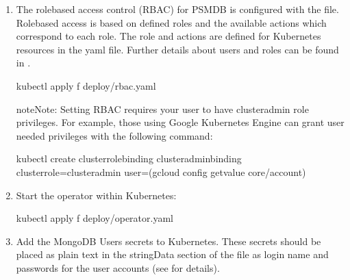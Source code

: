 \documentclass[letterpaper,10pt,english]{sphinxmanual}
\begin{document}
\begin{enumerate}
\begin{sphinxVerbatim}[commandchars=\\\{\}]
\PYGZdl{} kubectl create namespace psmdb
\PYGZdl{} kubectl config set\PYGZhy{}context kubectl config current\PYGZhy{}context \PYGZhy{}\PYGZhy{}namespacepsmdb
\end{sphinxVerbatim}

\item {} 
The role\sphinxhyphen{}based access control (RBAC) for PSMDB is configured with the  file. Role\sphinxhyphen{}based access is
based on defined roles and the available actions which correspond to
each role. The role and actions are defined for Kubernetes resources in the yaml file. Further details
about users and roles can be found in .

\begin{sphinxVerbatim}[commandchars=\\\{\}]
\PYGZdl{} kubectl apply \PYGZhy{}f deploy/rbac.yaml
\end{sphinxVerbatim}

\begin{sphinxadmonition}{note}{Note:}
Setting RBAC requires your user to have cluster\sphinxhyphen{}admin role
privileges. For example, those using Google Kubernetes Engine can
grant user needed privileges with the following command:

\begin{sphinxVerbatim}[commandchars=\\\{\}]
\PYGZdl{} kubectl create clusterrolebinding cluster\PYGZhy{}admin\PYGZhy{}binding \PYGZhy{}\PYGZhy{}clusterrole=cluster\PYGZhy{}admin \PYGZhy{}\PYGZhy{}user=\PYGZdl{}(gcloud config get\PYGZhy{}value core/account)
\end{sphinxVerbatim}
\end{sphinxadmonition}

\item {} 
Start the operator within Kubernetes:

\begin{sphinxVerbatim}[commandchars=\\\{\}]
\PYGZdl{} kubectl apply \PYGZhy{}f deploy/operator.yaml
\end{sphinxVerbatim}

\item {} 
Add the MongoDB Users secrets to Kubernetes. These secrets
should be placed as plain text in the stringData section of the
 file as login name and
passwords for the user accounts (see 
for details).


\end{enumerate}
\end{document}
